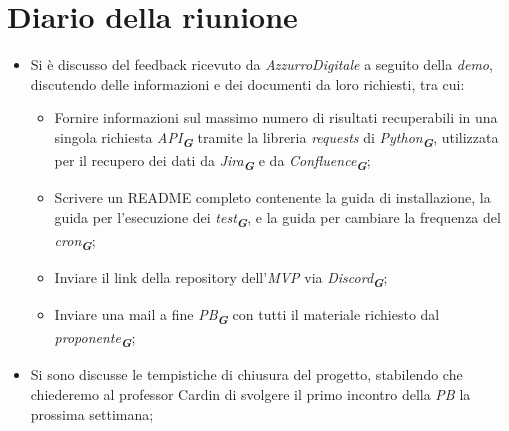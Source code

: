 
\section{Diario della riunione}

\begin{itemize}
    \item Si è discusso del feedback ricevuto da \emph{AzzurroDigitale} a seguito della \emph{demo}, discutendo delle informazioni e dei documenti da loro richiesti, tra cui: 
        \begin{itemize}
            \item Fornire informazioni sul massimo numero di risultati recuperabili in una singola richiesta \emph{API}\textsubscript{\textbf{\textit{G}}} tramite la libreria \emph{requests} di \emph{Python}\textsubscript{\textbf{\textit{G}}}, utilizzata per il recupero dei dati da \emph{Jira}\textsubscript{\textbf{\textit{G}}} e da \emph{Confluence}\textsubscript{\textbf{\textit{G}}};
            \item Scrivere un README completo contenente la guida di installazione, la guida per l'esecuzione dei \emph{test}\textsubscript{\textbf{\textit{G}}}, e la guida per cambiare la frequenza del \emph{cron}\textsubscript{\textbf{\textit{G}}};
            \item Inviare il link della repository dell'\emph{MVP} via \emph{Discord}\textsubscript{\textbf{\textit{G}}};
            \item Inviare una mail a fine \emph{PB}\textsubscript{\textbf{\textit{G}}} con tutti il materiale richiesto dal \emph{proponente}\textsubscript{\textbf{\textit{G}}};
        \end{itemize}

    \item Si sono discusse le tempistiche di chiusura del progetto, stabilendo che chiederemo al professor Cardin di svolgere il primo incontro della \emph{PB} la prossima settimana;
    

\end{itemize}
